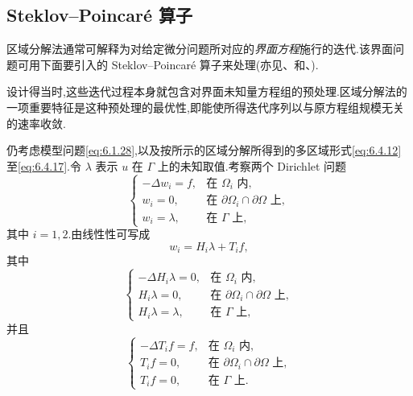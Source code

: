 \subsection{Steklov--Poincaré 算子}\label{sec:6.4.3}

区域分解法通常可解释为对给定微分问题所对应的\emph{界面方程}施行的迭代.该界面问题可用下面要引入的 Steklov--Poincaré 算子来处理(亦见、和、).

设计得当时,这些迭代过程本身就包含对界面未知量方程组的预处理.区域分解法的一项重要特征是这种预处理的最优性,即能使所得迭代序列以与原方程组规模无关的速率收敛.

仍考虑模型问题\eqref{eq:6.1.28},以及按所示的区域分解所得到的多区域形式\eqref{eq:6.4.12}至\eqref{eq:6.4.17}.令 \(\lambda\) 表示 \(u\) 在 \(\Gamma\) 上的未知取值.考察两个 Dirichlet 问题
\begin{equation}\label{eq:6.4.25}
  \begin{cases}
    -\Delta w_i=f,&\text{在 }\Omega_i\text{ 内},\\
    w_i=0,&\text{在 }\partial\Omega_i\cap\partial\Omega\text{ 上},\\
    w_i=\lambda,&\text{在 }\Gamma\text{ 上},
  \end{cases}
\end{equation}
其中 \(i=1,2\).由线性性可写成
\begin{equation}\label{eq:6.4.26}
  w_i=H_i\lambda+T_if,
\end{equation}
其中
\begin{equation}\label{eq:6.4.27}
  \begin{cases}
    -\Delta H_i\lambda=0,&\text{在 }\Omega_i\text{ 内},\\
    H_i\lambda=0,&\text{在 }\partial\Omega_i\cap\partial\Omega\text{ 上},\\
    H_i\lambda=\lambda,&\text{在 }\Gamma\text{ 上},
  \end{cases}
\end{equation}
并且
\begin{equation}\label{eq:6.4.28}
  \begin{cases}
    -\Delta T_if=f,&\text{在 }\Omega_i\text{ 内},\\
    T_if=0,&\text{在 }\partial\Omega_i\cap\partial\Omega\text{ 上},\\
    T_if=0,&\text{在 }\Gamma\text{ 上}.
  \end{cases}
\end{equation}
